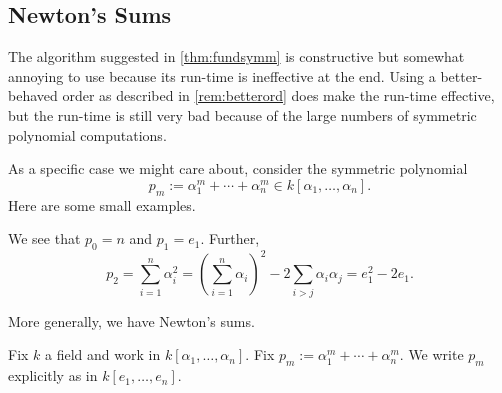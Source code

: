 \documentclass[../notes.tex]{subfiles}
\begin{document}
\subsection{Newton's Sums}
The algorithm suggested in \autoref{thm:fundsymm} is constructive but somewhat annoying to use because its run-time is ineffective at the end. Using a better-behaved order as described in \autoref{rem:betterord} does make the run-time effective, but the run-time is still very bad because of the large numbers of symmetric polynomial computations.

As a specific case we might care about, consider the symmetric polynomial
\[p_m:=\alpha_1^m+\cdots+\alpha_n^m\in k[\alpha_1,\ldots,\alpha_n].\]
Here are some small examples.
\begin{ex}
	We see that $p_0=n$ and $p_1=e_1.$ Further,
	\[p_2=\sum_{i=1}^n\alpha_i^2=\left(\sum_{i=1}^n\alpha_i\right)^2-2\sum_{i>j}\alpha_i\alpha_j=e_1^2-2e_1.\]
\end{ex}
More generally, we have Newton's sums.
\begin{exercise}
	Fix $k$ a field and work in $k[\alpha_1,\ldots,\alpha_n].$ Fix $p_m:=\alpha_1^m+\cdots+\alpha_n^m.$ We write $p_m$ explicitly as in $k[e_1,\ldots,e_n].$
\end{exercise}
\end{document}
